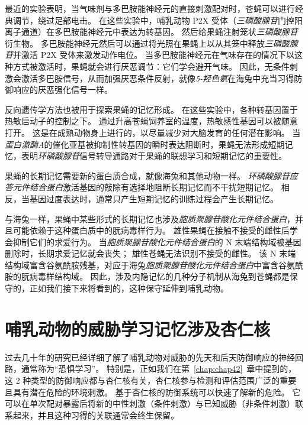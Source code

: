 最近的实验表明，当气味剂与多巴胺能神经元的直接刺激配对时，苍蝇可以进行经典调节，绕过足部电击。
在这些实验中，哺乳动物 P2X 受体（\textit{三磷酸腺苷}门控阳离子通道）在多巴胺能神经元中表达为转基因。
然后给果蝇注射笼状\textit{三磷酸腺苷}衍生物。
多巴胺能神经元然后可以通过将光照在果蝇上以从其笼中释放\textit{三磷酸腺苷}并激活 P2X 受体来激发动作电位。
当多巴胺能神经元在气味存在的情况下以这种方式被激活时，果蝇就会进行厌恶调节：它们学会避开气味。
因此，无条件刺激会激活多巴胺信号，从而加强厌恶条件反射，就像\textit{5-羟色氨}在海兔中充当习得防御响应的厌恶强化信号一样。


反向遗传学方法也被用于探索果蝇的记忆形成。
在这些实验中，各种转基因置于热敏启动子的控制之下。
通过升高苍蝇饲养室的温度，热敏感性基因可以被随意打开。
这是在成熟动物身上进行的，以尽量减少对大脑发育的任何潜在影响。
当\textit{蛋白激酶A}的催化亚基被抑制性转基因的瞬时表达阻断时，果蝇无法形成短期记忆，表明\textit{环磷酸腺苷}信号转导通路对于果蝇的联想学习和短期记忆的重要性。


果蝇的长期记忆需要新的蛋白质合成，就像海兔和其他动物一样。
\textit{环磷酸腺苷应答元件结合蛋白}激活基因的敲除有选择地阻断长期记忆而不干扰短期记忆。
相反，当基因过度表达时，通常只产生短期记忆的训练过程会产生长期记忆。


与海兔一样，果蝇中某些形式的长期记忆也涉及\textit{胞质聚腺苷酸化元件结合蛋白}，并且可能依赖于这种蛋白质中的朊病毒样行为。
雄性果蝇在接触不接受的雌性后学会抑制它们的求爱行为。
当\textit{胞质聚腺苷酸化元件结合蛋白}的 N 末端结构域被基因删除时，长期求爱记忆就会丧失；
雄性苍蝇无法识别不接受的雌性。
该 N 末端结构域富含谷氨酰胺残基，对应于海兔\textit{胞质聚腺苷酸化元件结合蛋白}中富含谷氨酰胺的朊病毒样结构域。
因此，涉及内隐记忆的几种分子机制从海兔到苍蝇都是保守的，正如我们接下来将看到的，这种保守延伸到哺乳动物。



\section{哺乳动物的威胁学习记忆涉及杏仁核}

过去几十年的研究已经详细了解了哺乳动物对威胁的先天和后天防御响应的神经回路，通常称为“恐惧学习”。
特别是，正如我们在第~\ref{chap:chap42}~章中提到的，这 2 种类型的防御响应都与杏仁核有关，杏仁核参与检测和评估范围广泛的重要且具有潜在危险的环境刺激。
基于杏仁核的防御系统可以快速了解新的危险。
它可以在单次配对暴露后将新的中性刺激（条件刺激）与已知威胁（非条件刺激）联系起来，并且这种习得的关联通常会终生保留。


